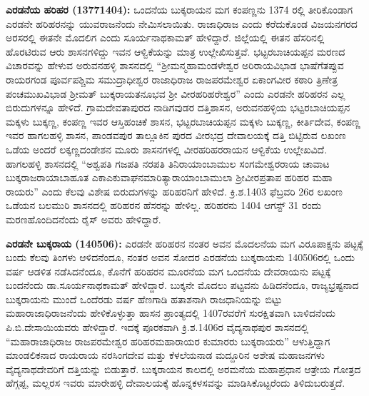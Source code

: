\textbf{ ಎರಡನೆಯ ಹರಿಹರ (13771404):} ಒಂದನೆಯ ಬುಕ್ಕರಾಯನ ಮಗ ಕಂಪಣ್ಣನು 1374 ರಲ್ಲಿ ತೀರಿಕೊಂಡಾಗ ಎರಡನೇ ಹರಿಹರನನ್ನು ಯುವರಾಜನೆಂದು ನೇಮಿಸಲಾಯಿತು. ರಾಜಾಧಿರಾಜ ಎಂದು ಕರೆದುಕೊಂಡ ವಿಜಯನಗರದ ಅರಸರಲ್ಲಿ ಈತನೇ ಮೊದಲಿಗ ಎಂದು ಸೂರ್ಯನಾಥಕಾಮತ್​ ಹೇಳಿದ್ದಾರೆ. ಜಿಲ್ಲೆಯಲ್ಲಿ ಈತನ ಹೆಸರಿನಲ್ಲಿ ಹೊರಟಿರುವ ಆರು ಶಾಸನಗಳಿದ್ದು ಇವನ ಆಳ್ವಿಕೆಯನ್ನು ಮಾತ್ರ ಉಲ್ಲೇಖಿಸುತ್ತವೆ. ಭಟ್ಟರಬಾಚಿಯಪ್ಪನ ಮರಣದ ವಿಚಾರವನ್ನು ಹೇಳುವ ಅರುವನಹಳ್ಳಿ ಶಾಸನದಲ್ಲಿ “ಶ‍್ರೀಮನ್ಮಹಾಮಂಡಳೇಶ್ವರ ಅರಿರಾಯವಿಭಾಡ ಭಾಷೆಗೆತಪ್ಪುವ ರಾಯರಗಂಡ ಪೂರ್ವಪಶ್ಚಿಮ ಸಮುದ್ರಾಧೀಶ್ವರ ರಾಜಾಧಿರಾಜ ರಾಜಪರಮೇಶ್ವರ ಏಕಾಂಗವೀರ ಕಠಾರಿ ತ್ರಿಣೇತ್ರ ಪಂಚಮುಖವಿಭಾಡ ಶ‍್ರೀಮತ್​ ಬುಕ್ಕರಾಯತನೂಭವ ಶ‍್ರೀ ವೀರಹರಿಹರೇಶ್ವರ” ಎಂದು ಎರಡನೇ ಹರಿಹರನ ಎಲ್ಲ ಬಿರುದುಗಳನ್ನೂ ಹೇಳಿದೆ. ಗ್ರಾಮದೇವತಾಪುರದ ನಾಡಿಗವುಡರ ದತ್ತಿಶಾಸನ, ಅರುವನಹಳ್ಳಿಯ ಭಟ್ಟರಬಾಚಿಯಪ್ಪನ ಮಕ್ಕಳು ಬುಕ್ಕಣ್ಣ, ಕಂಪಣ್ಣ ಇವರ ಆಸ್ತಿಹಂಚಿಕೆ ಶಾಸನ, ಭಟ್ಟರಬಾಚಿಯಪ್ಪನ ಮಕ್ಕಳು ಬುಕ್ಕಣ್ಣ, ಕೀರ್ತಿದೇವ, ಕಂಪಣ್ಣ ಇವರ ಹಾಗಲಹಳ್ಳಿ ಶಾಸನ, ಪಾಂಡವಪುರ ತಾಲ್ಲೂಕಿನ ಪುರದ ವೀರಭದ್ರ ದೇವಾಲಯಕ್ಕೆ ದತ್ತಿ ಬಿಟ್ಟಿರುವ ಲಖಂಣ ಒಡೆಯ ಅಂದರೆ ಲಕ್ಕಣ್ಣದಂಡೇಶನ ಮೂರು ಶಾಸನಗಳಲ್ಲಿ ವೀರಹರಿಹರರಾಯನ ಆಳ್ವಿಕೆಯ ಉಲ್ಲೇಖವಿದೆ. ಹಾಗಲಹಳ್ಳಿ ಶಾಸನದಲ್ಲಿ “ಅಶ್ವಪತಿ ಗಜಪತಿ ನರಪತಿ ತಿನಿರಾಯಾಂಬಾಮುಲ ಸಂಗಮೇಶ್ವರರಾಯ ಚಾವಾಟ ಬುಕ್ಕರಾಜರಾಯಾಬಾಹೂತ ಎಕಾಎಕುವಾಘನಮಾರಿತ್ಯಾರಾಯಾಂಬಾಮುಲಾ ಶ‍್ರೀವೀರಪ್ರತಾಪ ಹರಿಹರ ಮಹಾ ರಾಯರು” ಎಂದು ಕೆಲವು ವಿಶೇಷ ಬಿರುದುಗಳನ್ನು ಹರಿಹರನಿಗೆ ಹೇಳಿದೆ. ಕ್ರಿ.ಶ.1403 ಫೆಬ್ರವರಿ 26ರ ಲಖಂಣ ಒಡೆಯನ ಬಲಮುರಿ ಶಾಸನದಲ್ಲಿ ಹರಿಹರನ ಹೆಸರನ್ನು ಹೇಳಿಲ್ಲ. ಹರಿಹರನು 1404 ಆಗಸ್ಟ್​ 31 ರಂದು ಮರಣಹೊಂದಿದನೆಂದು ರೈಸ್​ ಅವರು ಹೇಳಿದ್ದಾರೆ. 

\textbf{ ಎರಡನೇ ಬುಕ್ಕರಾಯ (140506): } ಎರಡನೇ ಹರಿಹರನ ನಂತರ ಅವನ ಮೊದಲನೆಯ ಮಗ ವಿರೂಪಾಕ್ಷನು ಪಟ್ಟಕ್ಕೆ ಬಂದು ಕೆಲವು ತಿಂಗಳು ಆಳಿದನೆಂದೂ, ನಂತರ ಅವನ ಸೋದರ ಎರಡನೆಯ ಬುಕ್ಕರಾಯನು 140506ರಲ್ಲಿ ಒಂದು ವರ್ಷ ಆಡಳಿತ ನಡೆಸಿದನೆಂದೂ, ಕೊನೆಗೆ ಹರಿಹರನ ಮೂರನೆಯ ಮಗ ಒಂದನೆಯ ದೇವರಾಯನು ಪಟ್ಟಕ್ಕೆ ಬಂದನೆಂದು ಡಾ.ಸೂರ್ಯನಾಥಕಾಮತ್​ ಹೇಳಿದ್ದಾರೆ. ಬುಕ್ಕನೇ ಮೊದಲು ಪಟ್ಟವನು ಹಿಡಿದನೆಂದೂ, ರಾಜ್ಯಭ್ರಷ್ಟನಾದ ಬುಕ್ಕರಾಯನು ಮುಂದೆ ಒಂದೆರಡು ವರ್ಷ ಹೆಣಗಾಡಿ ಹತಾಶನಾಗಿ ರಾಜಧಾನಿಯನ್ನು ಬಿಟ್ಟು ಮಹಾರಾಜಾಧಿರಾಜನೆಂದು ಹೇಳಿಕೊಳ್ಳುತ್ತಾ ಹಾಸನ ಪ್ರಾಂತ್ಯದಲ್ಲಿ 1407ರವರೆಗೆ ಸುರಕ್ಷಿತವಾಗಿ ಬಾಳಿದನೆಂದು ಪಿ.ಬಿ.ದೇಸಾಯಿಯವರು ಹೇಳಿದ್ದಾರೆ. ಇದಕ್ಕೆ ಪೂರಕವಾಗಿ ಕ್ರಿ.ಶ.1406ರ ವೈದ್ಯನಾಥಪುರ ಶಾಸನದಲ್ಲಿ “ಮಹಾರಾಜಾಧಿರಾಜ ರಾಜಪರಮೇಶ್ವರ ಹರಿಹರಮಹಾರಾಯರ ಕುಮಾರರು ಬುಕ್ಕರಾಯರು” ಆಳುತ್ತಿದ್ದಾಗ ಮಾಂಡಲಿಕನಾದ ರಾಯರಾಯ ನರಸಿಂಗದೇವ ಮತ್ತು ಕೆಳಲೆಯನಾಡ ಮದ್ದೂರಿನ ಅಶೇಷ ಮಹಾಜನಗಳು ವೈದ್ಯನಾಥದೇವರಿಗೆ ದತ್ತಿಯನ್ನು ಬಿಡುತ್ತಾರೆ. ಬುಕ್ಕರಾಯನ ಕಾಲದಲ್ಲಿ ಅರಮನೆಯ ಮಹಾಪ್ರಧಾನ ಆತ್ರೇಯ ಗೋತ್ರದ ಹೆಗ್ಗಪ್ಪ, ಮಲ್ಲರಸ ಇವರು ಮಾರೇಹಳ್ಳಿ ದೇವಾಲಯಕ್ಕೆ ಹೊನ್ನಕಳಸವನ್ನು ಮಾಡಿಸಿಕೊಟ್ಟ\-ರೆಂದು ತಿಳಿದುಬರುತ್ತದೆ. 

